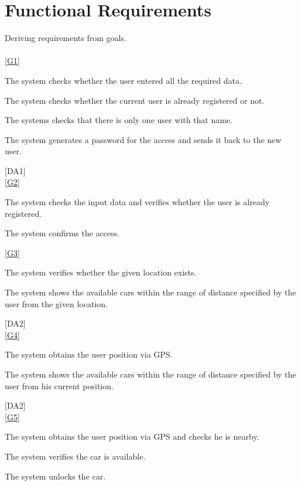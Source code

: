 \documentclass[11pt,a4paper]{report}
\begin{document}
\section{Functional Requirements}
Deriving requirements from goals.\\
\noindent \\
\noindent \ref{G1} \\
\begin{Req}
\item The system checks whether the user entered all the required data.
\item	The system checks whether the current user is already registered or not.
\item The systems checks that there is only one user with that name.
\item The system generates a password for the access and sends it back to the new user.
\end{Req}
	[DA1]\\
\noindent\ref{G2} \\
\begin{Req}[resume]
\item The system checks the input data and verifies whether the user is already registered.
\item The system confirms the access.
\end{Req}
\noindent\ref{G3} \\
\begin{Req}[resume]
\item The system verifies whether the given location exists.
\item The system shows the available cars within the range of distance specified by the user from the given location.
\end{Req}
	[DA2] \\
\noindent\ref{G4} \\
\begin{Req}[resume]
\item The system obtains the user position via GPS.
\item The system shows the available cars within the range of distance specified by the user from his current position.
\end{Req}
	[DA2] \\
\noindent\ref{G5} \\
\begin{Req}[resume]
\item The system obtains the user position via GPS and checks he is nearby.
\item The system verifies the car is available.
\item The system unlocks the car.
\end{Req}
\end{document}

